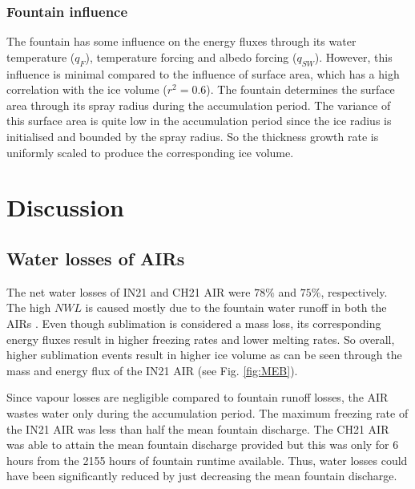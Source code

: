 \documentclass[utf8]{frontiersSCNS}
\begin{document}
\subsubsection{Fountain influence}

The fountain has some influence on the energy fluxes through its water temperature ($q_{F}$), temperature
forcing and albedo forcing ($q_{SW}$). However, this influence is minimal compared to the influence
of surface area, which has a high correlation with the ice volume ($r^2=0.6$). The fountain determines the
surface area through its spray radius during the accumulation period. The variance of this surface area is quite
low in the accumulation period since the ice radius is initialised and bounded by the spray radius. So the
thickness growth rate is uniformly scaled to produce the corresponding ice volume.


\section{Discussion}

\subsection{Water losses of AIRs}

The net water losses of IN21 and CH21 AIR were $78\%$ and $75\%$, respectively. The high $NWL$ is caused mostly
due to the fountain water runoff in both the AIRs . Even though sublimation is considered a mass loss, its
corresponding energy fluxes result in higher freezing rates and lower melting rates. So overall, higher
sublimation events result in higher ice volume as can be seen through the mass and energy flux of the IN21 AIR
(see Fig.  \ref{fig:MEB}).

Since vapour losses are negligible compared to fountain runoff losses, the AIR wastes water only during the
accumulation period. The maximum freezing rate of the IN21 AIR was less than half the mean fountain discharge. The
CH21 AIR was able to attain the mean fountain discharge provided but this was only for 6 hours from the 2155
hours of fountain runtime available. Thus, water losses could have been significantly reduced by just decreasing
the mean fountain discharge.
\end{document}
